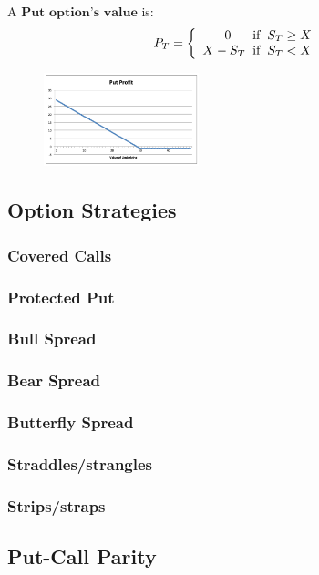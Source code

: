\begin{multicols}{2}
A $\boxed{\textbf{Put option's value}}$ is:
\begin{gather*}
    P_T=\left\{
        \begin{array}{ll}
            \begin{split}
                0\hspace*{0.6cm}&\text{if}\hspace*{0.2cm}S_T\geq X\\
                X-S_T\hspace*{0.2cm}&\text{if}\hspace*{0.2cm}S_T< X\\
            \end{split}
        \end{array}
        \right.
\end{gather*}
\begin{figure}[H]
    \centering 
    \includegraphics[width =0.4\textwidth]{Figure/put.png}
\end{figure}

\subsection{Option Strategies}
\subsubsection{Covered Calls}
\subsubsection{Protected Put}
\subsubsection{Bull Spread}
\subsubsection{Bear Spread}
\subsubsection{Butterfly Spread}
\subsubsection{Straddles/strangles}
\subsubsection{Strips/straps}

\subsection{Put-Call Parity}




\end{multicols}
